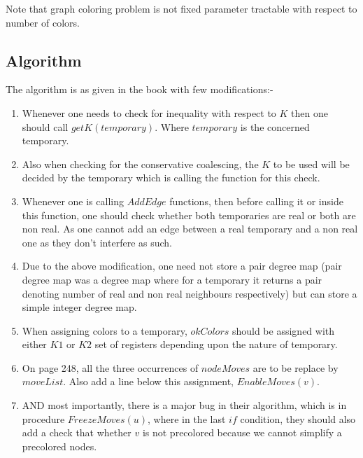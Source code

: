 Note that graph coloring problem is not fixed parameter tractable with
respect to number of colors.

\hypertarget{algorithm}{%
	\subsection{Algorithm}\label{algorithm}}

The algorithm is as given in the book with few modifications:-
\begin{enumerate}
	\item Whenever one needs to check for inequality with respect to $K$ then one should call $getK(temporary)$. Where $temporary$ is the concerned temporary.
	\item Also when checking for the conservative coalescing, the $K$ to be used will be decided by the temporary which is calling the function for this check.
	\item Whenever one is calling $AddEdge$ functions, then before calling it or inside this function, one should check whether both temporaries are real or both are non real. As one cannot add an edge between a real temporary and a non real one as they don't interfere as such.
	\item Due to the above modification, one need not store a pair degree map (pair degree map was a degree map where for a temporary it returns a pair denoting number of real and non real neighbours respectively) but can store a simple integer degree map.
	\item When assigning colors to a temporary, $okColors$ should be assigned with either $K1$ or $K2$ set of registers depending upon the nature of temporary.
	\item On page 248, all the three occurrences of $nodeMoves$ are to be replace by $moveList$. Also add a line below this assignment, $EnableMoves(v)$.
	\item AND most importantly, there is a major bug in their algorithm, which is in procedure $FreezeMoves(u)$, where in the last $if$ condition, they should also add a check that whether $v$ is not precolored because we cannot simplify a precolored nodes.
\end{enumerate}
